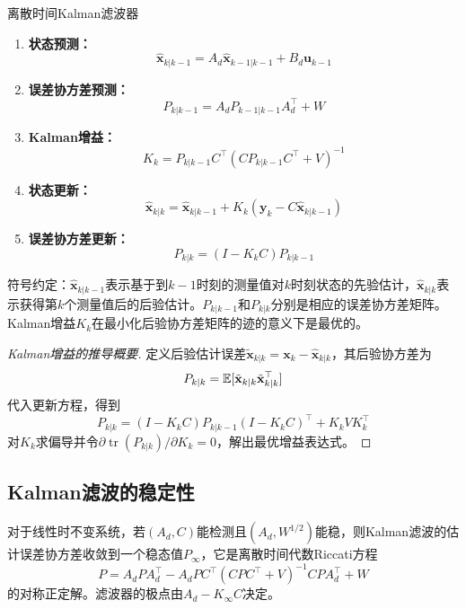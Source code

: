 \begin{myalgorithm}{离散时间Kalman滤波器}
\begin{enumerate}
\item \textbf{状态预测：}
\[
\hat{\mathbf{x}}_{k|k-1} = A_d\hat{\mathbf{x}}_{k-1|k-1} + B_d\mathbf{u}_{k-1}
\]
\item \textbf{误差协方差预测：}
\[
P_{k|k-1} = A_d P_{k-1|k-1} A_d^{\top} + W
\]
\item \textbf{Kalman增益：}
\[
K_k = P_{k|k-1}C^{\top}(C P_{k|k-1}C^{\top} + V)^{-1}
\]
\item \textbf{状态更新：}
\[
\hat{\mathbf{x}}_{k|k} = \hat{\mathbf{x}}_{k|k-1} + K_k(\mathbf{y}_k - C\hat{\mathbf{x}}_{k|k-1})
\]
\item \textbf{误差协方差更新：}
\[
P_{k|k} = (I - K_k C)P_{k|k-1}
\]
\end{enumerate}
\end{myalgorithm}

\begin{remark}
符号约定：$\hat{\mathbf{x}}_{k|k-1}$表示基于到$k-1$时刻的测量值对$k$时刻状态的先验估计，$\hat{\mathbf{x}}_{k|k}$表示获得第$k$个测量值后的后验估计。$P_{k|k-1}$和$P_{k|k}$分别是相应的误差协方差矩阵。Kalman增益$K_k$在最小化后验协方差矩阵的迹的意义下是最优的。
\end{remark}

\begin{proof}[Kalman增益的推导概要]
定义后验估计误差$\tilde{\mathbf{x}}_{k|k} = \mathbf{x}_k - \hat{\mathbf{x}}_{k|k}$，其后验协方差为
\[
P_{k|k} = \mathbb{E}[\tilde{\mathbf{x}}_{k|k}\tilde{\mathbf{x}}_{k|k}^{\top}]
\]
代入更新方程，得到
\[
P_{k|k} = (I - K_k C)P_{k|k-1}(I - K_k C)^{\top} + K_k V K_k^{\top}
\]
对$K_k$求偏导并令$\partial \operatorname{tr}(P_{k|k})/\partial K_k = 0$，解出最优增益表达式。
\end{proof}

\subsection{Kalman滤波的稳定性}

对于线性时不变系统，若$(A_d, C)$能检测且$(A_d, W^{1/2})$能稳，则Kalman滤波的估计误差协方差收敛到一个稳态值$P_{\infty}$，它是离散时间代数Riccati方程
\[
P = A_d P A_d^{\top} - A_d P C^{\top}(C P C^{\top} + V)^{-1} C P A_d^{\top} + W
\]
的对称正定解。滤波器的极点由$A_d - K_{\infty}C$决定。

